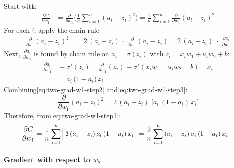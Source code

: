 \documentclass{article}
\begin{document}
\noindent Start with:
\begin{align}
    \frac{\partial C}{\partial w_1}
    &= \frac{\partial}{\partial w_1} \biggl(\frac{1}{n}\sum_{i=1}^{n}{{(a_i - z_i)}}^2\biggr)
    = \frac{1}{n} \sum_{i=1}^{n} \frac{\partial}{\partial w_1}{{(a_i - z_i)}}^2
    \label{eq:two-grad-w1-step1}
\end{align}
For each \(i\), apply the chain rule:
\begin{align}
    \frac{\partial}{\partial w_1} {{(a_i - z_i)}}^2
    &= 2\,{(a_i - z_i)}\;\cdot\;\frac{\partial}{\partial w_1}{(a_i - z_i)}
    = 2\,{(a_i - z_i)}\;\cdot\;\frac{\partial a_i}{\partial w_1}
    \label{eq:two-grad-w1-step2}
\end{align}
Next, \(\frac{\partial a_i}{\partial w_1}\) is found by chain rule on \(a_i = \sigma(z_i)\) with \(z_i = x_i w_1 + u_i w_2 + b\):
\begin{align}
    \frac{\partial a_i}{\partial w_1}
    &= \sigma'(z_i)\;\cdot\;\frac{\partial}{\partial w_1}(z_i)
    = \sigma'(x_i w_1 + u_i w_2 + b)\;\cdot\; x_i \\
    &= a_i\,\bigl(1 - a_i\bigr)\,x_i
    \label{eq:two-grad-w1-step3}
\end{align}
Combining\eqref{eq:two-grad-w1-step2} and\eqref{eq:two-grad-w1-step3}:
\[
    \frac{\partial}{\partial w_1}{(a_i - z_i)}^2
    = 2\,{(a_i - z_i)}\;\bigl[a_i\,(1 - a_i)\,x_i\bigr]
\]
Therefore, from\eqref{eq:two-grad-w1-step1}:
\begin{align}
    \frac{\partial C}{\partial w_1}
    &= \frac{1}{n} \sum_{i=1}^{n} \Bigl[\,2\,{(a_i - z_i)}\,a_i\,(1 - a_i)\,x_i\Bigr]
    = \frac{2}{n} \sum_{i=1}^{n} {(a_i - z_i)}\,a_i\,(1 - a_i)\,x_i
    \label{eq:two-grad-w1-final}
\end{align}

\paragraph{Gradient with respect to \(w_2\)\\}\label{sec:grad-w2-two-input}
\end{document}
